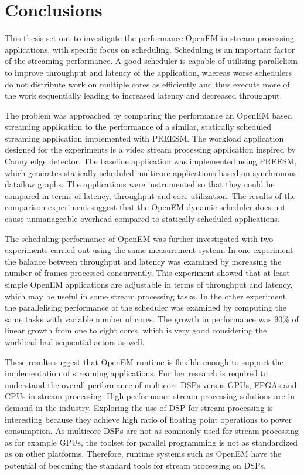 \chapter{Conclusions}
\label{chapter:conclusion}
This thesis set out to investigate the performance OpenEM in stream processing applications, with specific focus on scheduling. Scheduling is an important factor of the streaming performance. A good scheduler is capable of utilising parallelism to improve throughput and latency of the application, whereas worse schedulers do not distribute work on multiple cores as efficiently and thus execute more of the work sequentially leading to increased latency and decreased throughput.

The problem was approached by comparing the performance an OpenEM based streaming application to the performance of a similar, statically scheduled streaming application implemented with PREESM. The workload application designed for the experiments is a video stream processing application inspired by Canny edge detector. The baseline application was implemented using PREESM, which generates statically scheduled multicore applications based on synchronous dataflow graphs. The applications were instrumented so that they could be compared in terms of latency, throughput and core utilization. The results of the comparison experiment suggest that the OpenEM dynamic scheduler does not cause unmanageable overhead compared to statically scheduled applications. 

The scheduling performance of OpenEM was further investigated with two experiments carried out using the same measurement system. In one experiment the balance between throughput and latency was examined by increasing the number of frames processed concurrently. This experiment showed that at least simple OpenEM applications are adjustable in terms of throughput and latency, which may be useful in some stream processing tasks. In the other experiment the parallelising performance of the scheduler was examined by computing the same tasks with variable number of cores. The growth in performance was 90\% of linear growth from one to eight cores, which is very good considering the workload had sequential actors as well.

These results suggest that OpenEM runtime is flexible enough to support the implementation of streaming applications. Further research is required to understand the overall performance of multicore DSPs versus GPUs, FPGAs and CPUs in stream processing. High performance stream processing solutions are in demand in the industry. Exploring the use of DSP for stream processing is interesting because they achieve high ratio of floating point operations to power consumption. As multicore DSPs are not as commonly used for stream processing as for example GPUs, the toolset for parallel programming is not as standardized as on other platforms. Therefore, runtime systems such as OpenEM have the potential of becoming the standard tools for stream processing on DSPs.
